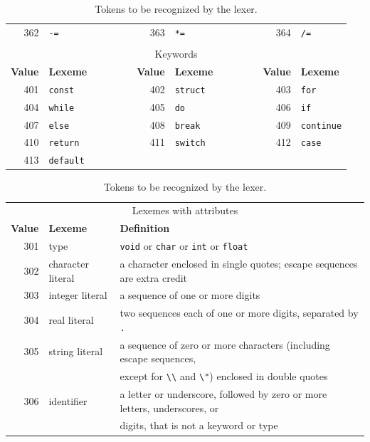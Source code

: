 \documentclass{article}
\begin{document}
\begin{table}[t]
\begin{tabular}{rlcrlcrl}
        		362 & \verb|-=| &&
        		363 & \verb|*=| &&
        		364 & \verb|/=| \\
        	\\
        		\multicolumn{8}{c}{Keywords}
        		\\[1mm]
        		{\bf Value} & {\bf Lexeme}
        		& ~~~~~~ &
        		{\bf Value} & {\bf Lexeme}
        		& ~~~~~~ &
        		{\bf Value} & {\bf Lexeme}
        		\\ \cline{1-2} \cline{4-5} \cline{7-8}
        		401 & \verb|const| &&
        		402 & \verb|struct| &&
        		403 & \verb|for| \\
        		404 & \verb|while| &&
        		405 & \verb|do| &&
        		406 & \verb|if| \\
        		407 & \verb|else| &&
        		408 & \verb|break| &&
        		409 & \verb|continue| \\
        		410 & \verb|return| &&
        		411 & \verb|switch| &&
        		412 & \verb|case| \\
        		413 & \verb|default| \\
        	\end{tabular}
        
        	\begin{tabular}{rll}
        		\\
        		\multicolumn{3}{c}{Lexemes with attributes}
        		\\[1mm]
        		{\bf Value} & {\bf Lexeme} & {\bf Definition}
        	  \\ \hline
        		301 & type & \verb|void| or \verb|char| or \verb|int| or \verb|float|
        		\\
        		302 & character literal & a character enclosed in single quotes;
        			escape sequences are extra credit
        		\\
        		303 & integer literal & a sequence of one or more digits
        		\\
        		304 & real literal & two sequences each of one or more digits, separated by \verb|.|
        		\\
        		305 & string literal & a sequence of zero or more characters (including escape sequences,
        		\\ & & except for \verb|\\| and \verb|\"|) enclosed in double quotes
        		\\
        		306 & identifier & a letter or underscore, followed by zero or more letters,
        			underscores, or
        		\\ & & digits, that is not a keyword or type
        	\end{tabular}
        
        	\caption{Tokens to be recognized by the lexer.}
        	\label{TAB:tokens}
        \end{table}
\end{document}
